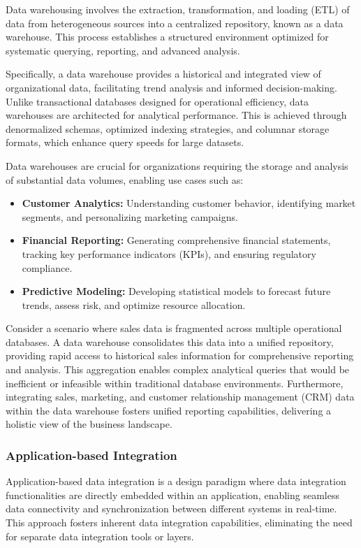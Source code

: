 \documentclass[12pt]{book}
\begin{document}
Data warehousing involves the extraction, transformation, and loading (ETL) of data from heterogeneous sources into a centralized repository, known as a data warehouse. This process establishes a structured environment optimized for systematic querying, reporting, and advanced analysis.

Specifically, a data warehouse provides a historical and integrated view of organizational data, facilitating trend analysis and informed decision-making. Unlike transactional databases designed for operational efficiency, data warehouses are architected for analytical performance. This is achieved through denormalized schemas, optimized indexing strategies, and columnar storage formats, which enhance query speeds for large datasets.

Data warehouses are crucial for organizations requiring the storage and analysis of substantial data volumes, enabling use cases such as:

\begin{itemize}
    \item \textbf{Customer Analytics:} Understanding customer behavior, identifying market segments, and personalizing marketing campaigns.
    \item \textbf{Financial Reporting:} Generating comprehensive financial statements, tracking key performance indicators (KPIs), and ensuring regulatory compliance.
    \item \textbf{Predictive Modeling:} Developing statistical models to forecast future trends, assess risk, and optimize resource allocation.
\end{itemize}

Consider a scenario where sales data is fragmented across multiple operational databases. A data warehouse consolidates this data into a unified repository, providing rapid access to historical sales information for comprehensive reporting and analysis. This aggregation enables complex analytical queries that would be inefficient or infeasible within traditional database environments. Furthermore, integrating sales, marketing, and customer relationship management (CRM) data within the data warehouse fosters unified reporting capabilities, delivering a holistic view of the business landscape.

\subsubsection{Application-based Integration}

Application-based data integration is a design paradigm where data integration functionalities are directly embedded within an application, enabling seamless data connectivity and synchronization between different systems in real-time. This approach fosters inherent data integration capabilities, eliminating the need for separate data integration tools or layers.
\end{document}
